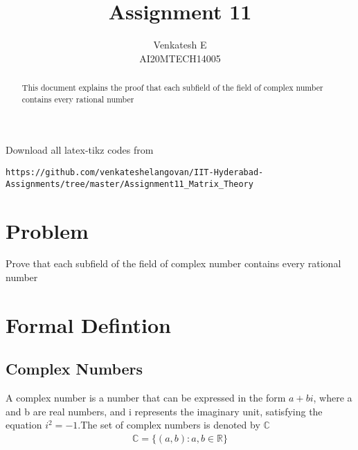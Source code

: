 \documentclass[journal,12pt,twocolumn]{IEEEtran}
\begin{document}
\makeatletter
{}
\makeatother
\let\StandardTheFigure\thefigure
\let\vec\mathbf
\renewcommand{\thefigure}{\theproblem}
\def\putbox#1#2#3{\makebox[0in][l]{\makebox[#1][l]{}\raisebox{\baselineskip}[0in][0in]{\raisebox{#2}[0in][0in]{#3}}}}
     \def\rightbox#1{\makebox[0in][r]{#1}}
     \def\centbox#1{\makebox[0in]{#1}}
     \def\topbox#1{\raisebox{-\baselineskip}[0in][0in]{#1}}
     \def\midbox#1{\raisebox{-0.5\baselineskip}[0in][0in]{#1}}
\vspace{3cm}
\title{Assignment 11}
\author{Venkatesh E\\AI20MTECH14005}
\maketitle
\newpage
\bigskip
\renewcommand{\thefigure}{\theenumi}
\renewcommand{\thetable}{\theenumi}
\begin{abstract}
This document explains the proof that each subfield of the field of complex number contains every rational number
\end{abstract}
Download all latex-tikz codes from 
%
\begin{lstlisting}
https://github.com/venkateshelangovan/IIT-Hyderabad-Assignments/tree/master/Assignment11_Matrix_Theory
\end{lstlisting}
\section{Problem}
Prove that each subfield of the field of complex number contains every rational number
\section{Formal Defintion}
\subsection{Complex Numbers}
A complex number is a number that can be expressed in the form $a + bi$, where a and b are real numbers, and i represents the imaginary unit, satisfying the equation $i^2 =-1$.The set of complex numbers is denoted by $\mathbb{C}$
\begin{align}
    \mathbb{C}=\{(a,b):a,b \in \mathbb{R}\}
\end{align}
\end{document}
